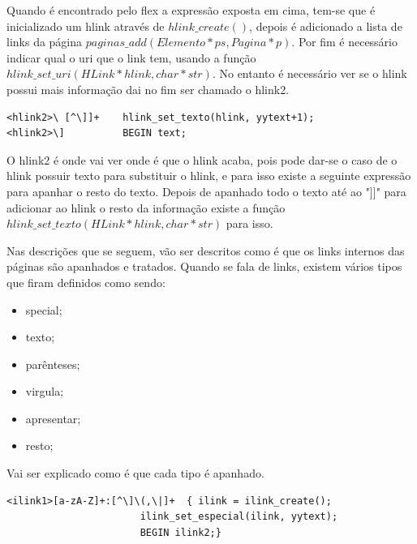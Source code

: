 \documentclass[11pt, a4paper, oneside]{article}
\begin{document}
Quando é  encontrado pelo flex a expressão exposta em cima, tem-se que é inicializado um hlink através de \begin{math} hlink\_create() \end{math}, depois é adicionado a lista de links da página  \begin{math} paginas\_add(Elemento* ps, Pagina* p)\end{math}. Por fim  é necessário indicar qual o uri que o link tem, usando a função  \begin{math} hlink\_set\_uri(HLink* hlink, char* str)\end{math}.
No entanto é necessário ver se o hlink possui mais informação dai no fim ser chamado o hlink2.


\begin{verbatim}
<hlink2>\ [^\]]+    hlink_set_texto(hlink, yytext+1);
<hlink2>\]          BEGIN text;

\end{verbatim}

O hlink2 é onde vai ver onde é que o hlink acaba, pois pode dar-se o caso de o hlink possuir texto para substituir o hlink, e para isso existe a seguinte expressão para apanhar o resto do texto. Depois de apanhado todo o texto até ao "]]" para adicionar ao hlink o resto da informação existe a função \begin{math} hlink\_set\_texto(HLink* hlink, char* str) \end{math} para isso.

Nas descrições que se seguem, vão ser descritos como é que os links internos das páginas são apanhados e tratados.
Quando se fala de links, existem vários tipos que firam definidos como sendo:
\begin{itemize}
\item special;
\item texto;
\item parênteses;
\item virgula;
\item apresentar;
\item resto;
\end{itemize}


Vai ser explicado como é que cada tipo é apanhado.

\begin{verbatim}
<ilink1>[a-zA-Z]+:[^\]\(,\|]+  { ilink = ilink_create();
                       ilink_set_especial(ilink, yytext); 
                       BEGIN ilink2;}
\end{verbatim}
\end{document}
